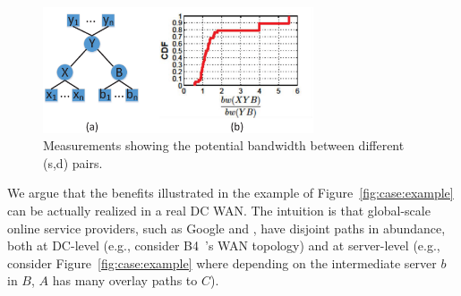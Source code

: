 
\begin{figure}[t]
\centering
\includegraphics[width=80mm]{images/potential.eps}%
\caption{Measurements showing the potential bandwidth between different (s,d) pairs.}
\label{fig:case:size}
\vspace{-0.4cm}
\end{figure}

We argue that the benefits illustrated in the example of
Figure~\ref{fig:case:example} can be actually realized in a
real DC WAN. The intuition is that
global-scale online service providers,
such as Google and \company, have disjoint paths in abundance,
both at DC-level (e.g., consider B4~\cite{b4}'s WAN topology)
and at server-level (e.g., consider Figure~\ref{fig:case:example}
where depending on the intermediate server $b$ in $B$,
$A$ has many overlay paths to $C$).

